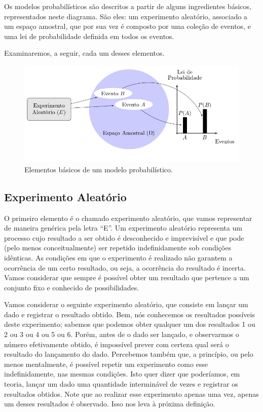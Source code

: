 \documentclass[
]{book}
\theoremstyle{definition}
\theoremstyle{definition}
\theoremstyle{definition}
\theoremstyle{remark}
\begin{document}
Os modelos probabilísticos são descritos a partir de alguns ingredientes básicos, representados neste diagrama. São eles: um experimento aleatório, associado a um espaço amostral, que por sua vez é composto por uma coleção de eventos, e uma lei de probabilidade definida em todos os eventos.

Examinaremos, a seguir, cada um desses elementos.

\begin{figure}
\includegraphics[width=1\linewidth]{img/probabilidade-modelo} \caption{Elementos básicos de um modelo probabilístico.}\label{fig:ch2-probabilidade-modelo}
\end{figure}

\hypertarget{experimento-aleatuxf3rio}{%
\subsection*{Experimento Aleatório}\label{experimento-aleatuxf3rio}}

O primeiro elemento é o chamado experimento aleatório, que vamos representar de maneira genérica pela letra ``E''. Um experimento aleatório representa um processo cujo resultado a ser obtido é desconhecido e imprevisível e que pode (pelo menos conceitualmente) ser repetido indefinidamente sob condições idênticas. As condições em que o experimento é realizado não garantem a ocorrência de um certo resultado, ou seja, a ocorrência do resultado é incerta. Vamos considerar que sempre é possível obter um resultado que pertence a um conjunto fixo e conhecido de possibilidades.

Vamos considerar o seguinte experimento aleatório, que consiste em lançar um dado e registrar o resultado obtido. Bem, nós conhecemos os resultados possíveis deste experimento; sabemos que podemos obter qualquer um dos resultados 1 ou 2 ou 3 ou 4 ou 5 ou 6. Porém, antes de o dado ser lançado, e observarmos o número efetivamente obtido, é impossível prever com certeza qual será o resultado do lançamento do dado. Percebemos também que, a princípio, ou pelo menos mentalmente, é possível repetir um experimento como esse indefinidamente, nas mesmas condições. Isto quer dizer que poderíamos, em teoria, lançar um dado uma quantidade interminável de vezes e registrar os resultados obtidos. Note que ao realizar esse experimento apenas uma vez, apenas um desses resultados é observado. Isso nos leva à próxima definição.
\end{document}
